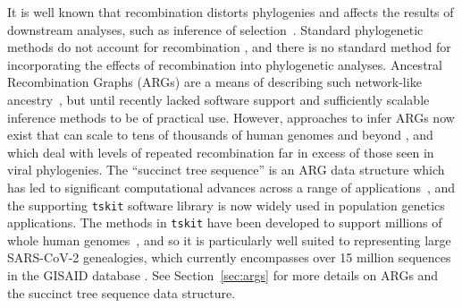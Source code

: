 \documentclass{article}
\begin{document}

It is well known that recombination distorts phylogenies \citep{Schierup2000-fg}
and affects the results of downstream analyses, such as inference of
selection~\citep{Anisimova2003-vr}. Standard phylogenetic methods do
not account for recombination
\citep[e.g.,][]{Ronquist2012-zw,Minh2020-lr,Guindon2003-zd}, and there is
no standard method for incorporating the effects of recombination into
phylogenetic analyses.
Ancestral Recombination Graphs (ARGs) are a means of describing such
network-like ancestry~\citep{Griffiths1981-lw,Gusfield2014-qw}, but
until recently lacked software support and sufficiently scalable
inference methods to be of practical use.
However, approaches to infer ARGs now exist that can scale to tens of
thousands of human genomes and beyond
\citep{Speidel2019-yh,Kelleher2019-ba,Schaefer2021-yg,Zhang2023-lf}, and which
deal with levels of repeated recombination far in excess of those seen in viral
phylogenies. The ``succinct tree sequence'' is an ARG data structure
which has led to significant computational advances across a range
of
applications~\citep{Kelleher2016-wk,Kelleher2018-xc,Kelleher2019-ba,Ralph2020-efficiently,
Wohns2022-th}, and the supporting \texttt{tskit} software library
is now widely used in population genetics applications.
The methods in \texttt{tskit} have been developed to support millions of
whole human genomes~\citep{Kelleher2019-ba}, and so it is particularly well suited
to representing large SARS-CoV-2 genealogies,
which currently encompasses over 15 million sequences in the GISAID database
\citep{Shu2017-hp}.
See Section~\ref{sec:args} for more details on ARGs and the succinct
tree sequence data structure.
\end{document}
